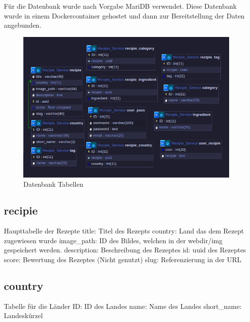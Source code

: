 \documentclass{article}
\begin{document}
Für die Datenbank wurde nach Vorgabe MariDB verwendet. Diese Datenbank wurde in einem Dockercontainer gehostet und dann zur Bereitstellung der Daten angebunden.

\begin{figure}[!hbt]
    \centering
    \includegraphics[scale=0.75, width=\textwidth]{Pictures/DB_Tables2.png}
    \caption{Datenbank Tabellen}
    \label{fig:sfig1}
\end{figure}

\subsection{recipie}
Haupttabelle der Rezepte
\newline
title: Titel des Rezepts
\newline
country: Land das dem Rezept zugewiesen wurde
\newline
image\_path: ID des Bildes, welchen in der webdir/img gespeichert werden.
\newline
description: Beschreibung des Rezeptes
\newline
id: uuid des Rezeptes
\newline
score: Bewertung des Rezeptes (Nicht genutzt)
\newline
slug: Referenzierung in der URL

\subsection{country}
Tabelle für die Länder
ID: ID des Landes
\newline
name: Name des Landes
\newline
short\_name: Landeskürzel
\end{document}
